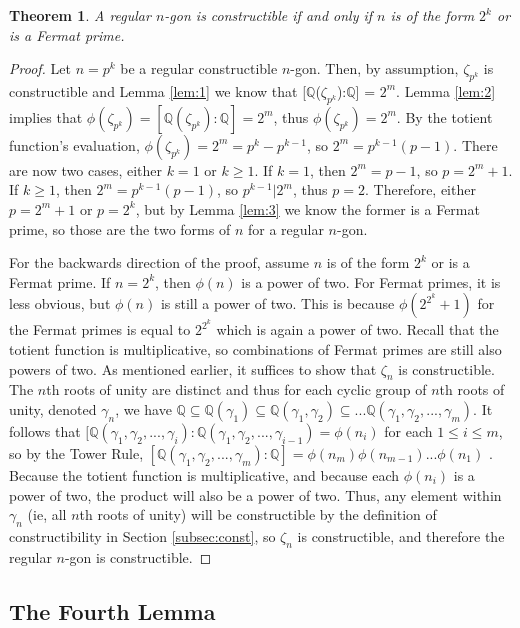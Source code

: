 \documentclass[reqno]{amsart}
\newtheorem{theorem}{Theorem}[section]
\theoremstyle{definition}
\numberwithin{equation}{section}
\newcommand{\bQ}{\mathbb{Q}}
\begin{document}
\begin{theorem}\label{thm:mini}
A regular $n$-gon is constructible if and only if $n$ is of the form $2^k$ or is a Fermat prime.
\end{theorem}
\begin{proof}
Let $n=p^k$ be a regular constructible $n$-gon. Then, by assumption, $\zeta_{p^k}$ is constructible and Lemma \ref{lem:1} we know that [$\bQ$($\zeta_{p^k}$):$\bQ$] = $2^m$. Lemma \ref{lem:2} implies that $ \phi(\zeta_{p^k}) = [\bQ(\zeta_{p^k}):\bQ] = 2^m$, thus $ \phi(\zeta_{p^k}) = 2^m$. By the totient function's evaluation, $ \phi(\zeta_{p^k}) = 2^m = p^k - p^{k-1}$, so $2^m = p^{k-1}(p-1)$. There are now two cases, either $k=1$ or $k \ge 1$. If $k=1$, then $2^m = p-1$, so $p= 2^m + 1$. If $k \ge 1$, then $2^m = p^{k-1}(p-1)$, so $p^{k-1} | 2^m$, thus $p=2$. Therefore, either $p = 2^m + 1$ or $p=2^k$, but by Lemma \ref{lem:3} we know the former is a Fermat prime, so those are the two forms of $n$ for a regular $n$-gon.

For the backwards direction of the proof, assume $n$ is of the form $2^k$ or is a Fermat prime. If $n = 2^k$, then $\phi(n)$ is a power of two. For Fermat primes, it is less obvious, but $\phi(n)$ is still a power of two. This is because $\phi(2^{2^k}+1)$ for the Fermat primes is equal to $2^{2^k}$ which is again a power of two. Recall that the totient function is multiplicative, so combinations of Fermat primes are still also powers of two. As mentioned earlier, it suffices to show that $\zeta_n$ is constructible. The $n$th roots of unity are distinct and thus for each cyclic group of $n$th roots of unity, denoted $\gamma_n$, we have $\bQ \subseteq \bQ(\gamma_1) \subseteq \bQ(\gamma_1, \gamma_2) \subseteq ... \bQ(\gamma_1, \gamma_2, ..., \gamma_m)$. It follows that $[\bQ(\gamma_1, \gamma_2, ..., \gamma_i) : \bQ(\gamma_1, \gamma_2, ..., \gamma_{i-1}) = \phi(n_i)$ for each $1 \leq i \leq m$, so by the Tower Rule, $[\bQ(\gamma_1, \gamma_2, ..., \gamma_m) : \bQ] = \phi(n_m)\phi(n_{m-1})...\phi(n_1)$ \cite{dummit}. Because the totient function is multiplicative, and because each $\phi(n_i)$ is a power of two, the product will also be a power of two. Thus, any element within $\gamma_n$ (ie, all $n$th roots of unity) will be constructible by the definition of constructibility in Section \ref{subsec:const}, so $\zeta_n$ is constructible, and therefore the regular $n$-gon is constructible.
\end{proof}

\subsection{The Fourth Lemma}
\end{document}
